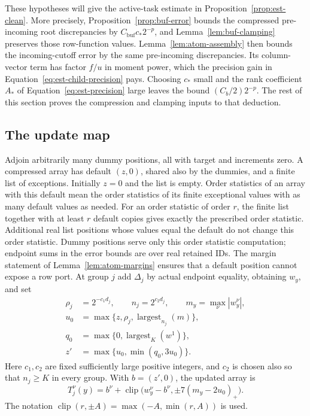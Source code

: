 These hypotheses will give the active-task estimate in
Proposition~\ref{prop:est-clean}. More precisely,
Proposition~\ref{prop:buf-error} bounds the compressed pre-incoming
root discrepancies by $C_{\mathrm{buf}}c_*2^{-p}$, and
Lemma~\ref{lem:buf-clamping} preserves those row-function values.
Lemma~\ref{lem:atom-assembly} then bounds the incoming-cutoff error by
the same pre-incoming discrepancies. Its column-vector term has factor
$f/u$ in moment power, which the precision gain in
Equation~\eqref{eq:est-child-precision} pays. Choosing $c_*$ small and
the rank coefficient $A_*$ of Equation~\eqref{eq:est-precision} large
leaves the bound $(C_b/2)2^{-p}$.
The rest of this section proves the compression and clamping inputs
to that deduction.

\subsection{The update map}

Adjoin arbitrarily many dummy positions, all with target and increments
zero.  A compressed array has default $(z,0)$, shared also by the dummies,
and a finite list of exceptions.  Initially $z=0$ and the list is empty.
Order statistics of an array with this default mean the order statistics
of its finite exceptional values with as many default values as needed.
For an order statistic of order $r$, the finite list together with at least $r$
default copies gives exactly the prescribed order statistic.  Additional real list
positions whose values equal the default do not change this order statistic.
Dummy positions serve only this order statistic computation; endpoint sums in the
error bounds are over real retained IDs.  The margin statement of
Lemma~\ref{lem:atom-margins} ensures that a default position cannot expose
a row port.
At group $j$ add $\Delta_j$ by actual endpoint equality, obtaining $w_y$,
and set
\begin{equation}
 \begin{aligned}
 \rho_j&=2^{-c_1d_j},\qquad n_j=2^{c_2d_j},\qquad
 m_y=\max_\nu|w_y^\nu|,\\
 u_0&=\max\{z,\rho_j,\operatorname{largest}_{n_j}(m)\},\\
 q_0&=\max\{0,\operatorname{largest}_K(w^1)\},\\
 z'&=\max\{u_0,\min(q_0,3u_0)\}.
 \end{aligned}
 \label{eq:buf-thresholds}
\end{equation}
Here $c_1,c_2$ are fixed sufficiently large positive integers, and
$c_2$ is chosen also so that $n_j\geq K$ in every group.
With $b=(z',0)$, the updated array is
\begin{equation}
 T_j^\nu(y)=b^\nu+
 \operatorname{clip}\bigl(w_y^\nu-b^\nu,
                \pm7(m_y-2u_0)_+\bigr).
 \label{eq:buf-update}
\end{equation}
The notation $\operatorname{clip}(r,\pm A)=\max(-A,\min(r,A))$ is used.

